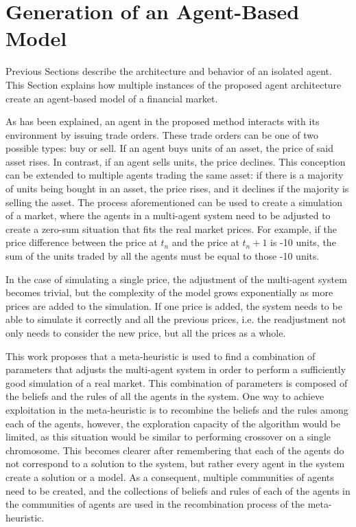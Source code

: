 \section{Generation of an Agent-Based Model}
\label{section:generation-of-an-agent-based-model}

Previous Sections describe the architecture and behavior of an isolated
agent. This Section explains how multiple instances of the proposed agent
architecture create an agent-based model of a financial market.

As has been explained, an agent in the proposed method interacts with its
environment by issuing trade orders. These trade orders can be one of two
possible types: buy or sell. If an agent buys units of an asset, the price of
said asset rises. In contrast, if an agent sells units, the price declines. This
conception can be extended to multiple agents trading the same asset: if there
is a majority of units being bought in an asset, the price rises, and it
declines if the majority is selling the asset. The process aforementioned can be
used to create a simulation of a market, where the agents in a multi-agent
system need to be adjusted to create a zero-sum situation that fits the real
market prices. For example, if the price difference between the price at $t_n$
and the price at $t_n+1$ is -10 units, the sum of the units traded by all the
agents must be equal to those -10 units.

In the case of simulating a single price, the adjustment of the multi-agent
system becomes trivial, but the complexity of the model grows exponentially as
more prices are added to the simulation. If one price is added, the system needs
to be able to simulate it correctly and all the previous prices, i.e. the
readjustment not only needs to consider the new price, but all the prices as a
whole.

This work proposes that a meta-heuristic is used to find a combination of
parameters that adjusts the multi-agent system in order to perform a
sufficiently good simulation of a real market. This combination of parameters is
composed of the beliefs and the rules of all the agents in the system. One way
to achieve exploitation in the meta-heuristic is to recombine the beliefs and
the rules among each of the agents, however, the exploration capacity of the
algorithm would be limited, as this situation would be similar to performing
crossover on a single chromosome. This becomes clearer after remembering that
each of the agents do not correspond to a solution to the system, but rather
every agent in the system create a solution or a model. As a consequent,
multiple communities of agents need to be created, and the collections of
beliefs and rules of each of the agents in the communities of agents are used in
the recombination process of the meta-heuristic.

